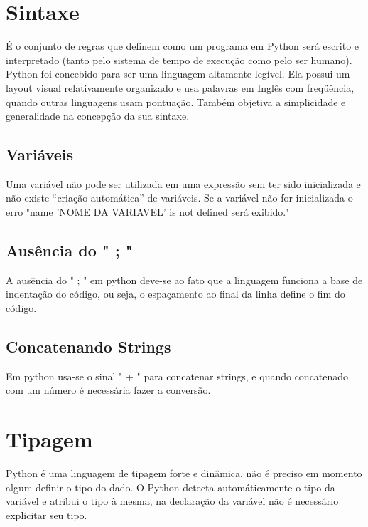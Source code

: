 \documentclass[12pt]{article}
\begin{document}


\section{Sintaxe }
É o conjunto de regras que definem como um programa em Python será escrito e interpretado (tanto pelo sistema de tempo de execução como pelo ser humano). Python foi concebido para ser uma linguagem altamente legível. Ela possui um layout visual relativamente organizado e usa palavras em Inglês com freqüência, quando outras linguagens usam pontuação. Também objetiva a simplicidade e generalidade na concepção da sua sintaxe.

\subsection{Variáveis}
Uma variável não pode ser utilizada em uma expressão sem ter sido inicializada e não existe “criação automática” de variáveis. Se a variável não for inicializada o erro "name 'NOME DA VARIAVEL' is not defined será exibido."


\subsection{Ausência do " ; "}

A ausência do " ; " em python deve-se ao fato que a linguagem funciona a base de indentação do código, ou seja, o espaçamento ao final da linha define o fim do código.

\subsection{Concatenando Strings}

Em python usa-se o sinal " + " para concatenar strings, e quando concatenado com um número é necessária fazer a conversão.



\section{Tipagem}

Python é uma linguagem de tipagem forte e dinâmica, não é preciso em momento algum definir o tipo do dado. O Python detecta automáticamente o tipo da variável e atribui o tipo à mesma, na declaração da variável não é necessário explicitar seu tipo.
\end{document}

